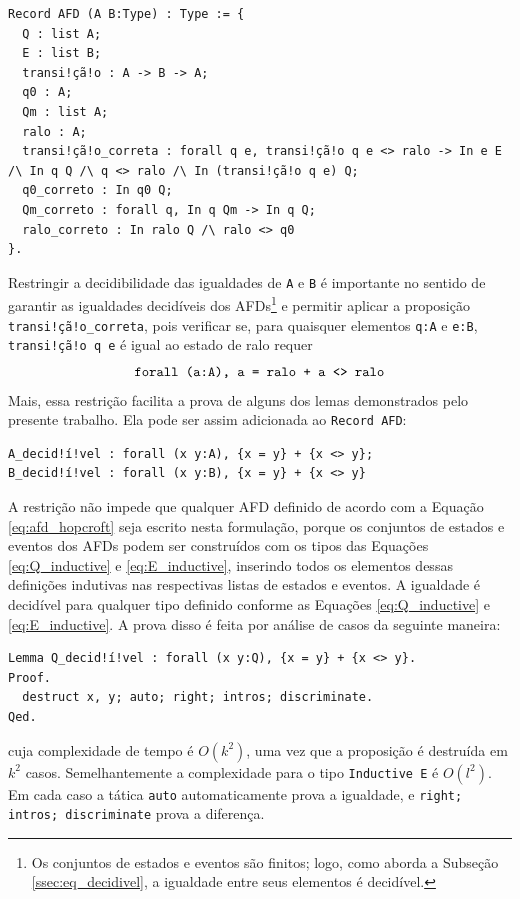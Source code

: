 \begin{verbatim}
Record AFD (A B:Type) : Type := {
  Q : list A;
  E : list B;
  transi!çã!o : A -> B -> A;
  q0 : A;
  Qm : list A;
  ralo : A;
  transi!çã!o_correta : forall q e, transi!çã!o q e <> ralo -> In e E /\ In q Q /\ q <> ralo /\ In (transi!çã!o q e) Q;
  q0_correto : In q0 Q;
  Qm_correto : forall q, In q Qm -> In q Q;
  ralo_correto : In ralo Q /\ ralo <> q0
}.
\end{verbatim}

Restringir a decidibilidade das igualdades de \texttt{A} e \texttt{B} é importante no sentido de garantir as igualdades decidíveis dos AFDs\footnote{Os conjuntos de estados e eventos são finitos; logo, como aborda a Subseção \ref{ssec:eq_decidivel}, a igualdade entre seus elementos é decidível.} e permitir aplicar a proposição \texttt{transi!çã!o_correta}, pois verificar se, para quaisquer elementos \texttt{q:A} e \texttt{e:B}, \texttt{transi!çã!o q e} é igual ao estado de ralo requer $$\text{\texttt{forall (a:A), {a = ralo} + {a <> ralo}}}$$ Mais, essa restrição facilita a prova de alguns dos lemas demonstrados pelo presente trabalho. Ela pode ser assim adicionada ao \texttt{Record AFD}:

\begin{verbatim}
A_decid!í!vel : forall (x y:A), {x = y} + {x <> y};
B_decid!í!vel : forall (x y:B), {x = y} + {x <> y}
\end{verbatim}

A restrição não impede que qualquer AFD definido de acordo com a Equação \ref{eq:afd_hopcroft} seja escrito nesta formulação, porque os conjuntos de estados e eventos dos AFDs podem ser construídos com os tipos das Equações \ref{eq:Q_inductive} e \ref{eq:E_inductive}, inserindo todos os elementos dessas definições indutivas nas respectivas listas de estados e eventos. A igualdade é decidível para qualquer tipo definido conforme as Equações \ref{eq:Q_inductive} e \ref{eq:E_inductive}. A prova disso é feita por análise de casos da seguinte maneira:

\begin{verbatim}
Lemma Q_decid!í!vel : forall (x y:Q), {x = y} + {x <> y}.
Proof.
  destruct x, y; auto; right; intros; discriminate.
Qed.
\end{verbatim}

\noindent
cuja complexidade de tempo é $O(k^2)$, uma vez que a proposição é destruída em $k^2$ casos. Semelhantemente a complexidade para o tipo \texttt{Inductive E} é $O(l^2)$. Em cada caso a tática \texttt{auto} automaticamente prova a igualdade, e \texttt{right; intros; discriminate} prova a diferença.

